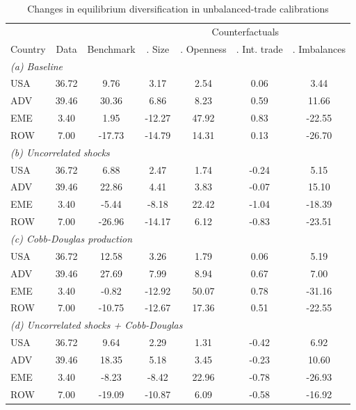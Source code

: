 \begin{table}[p]
\begin{center}
\caption{Changes in equilibrium diversification in unbalanced-trade calibrations}
\label{tab:results-div-sens}
\small
\begin{tabular}{l c c c c c c}
\toprule
& & & \multicolumn{4}{c}{Counterfactuals}\\
\cmidrule(rl){4-7}
Country & \multicolumn{1}{p{2.0cm}}{\centering Data} & \multicolumn{1}{p{2.0cm}}{\centering Benchmark} & \multicolumn{1}{p{2.0cm}}{\centering 1. Size} & \multicolumn{1}{p{2.0cm}}{\centering 2. Openness} & \multicolumn{1}{p{2.0cm}}{\centering 3. Int. trade} &\multicolumn{1}{p{2.0cm}}{\centering 4. Imbalances}\\
\midrule
\multicolumn{6}{l}{\textit{(a) Baseline}}\\
USA& 36.72&9.76&3.17&2.54&0.06&3.44\\
ADV& 39.46&30.36&6.86&8.23&0.59&11.66\\
EME& 3.40&1.95&-12.27&47.92&0.83&-22.55\\
ROW& 7.00&-17.73&-14.79&14.31&0.13&-26.70\\
\midrule
\multicolumn{6}{l}{\textit{(b) Uncorrelated shocks}}\\
USA& 36.72&6.88&2.47&1.74&-0.24&5.15\\
ADV& 39.46&22.86&4.41&3.83&-0.07&15.10\\
EME& 3.40&-5.44&-8.18&22.42&-1.04&-18.39\\
ROW& 7.00&-26.96&-14.17&6.12&-0.83&-23.51\\
\midrule
\multicolumn{6}{l}{\textit{(c) Cobb-Douglas production}}\\
USA& 36.72&12.58&3.26&1.79&0.06&5.19\\
ADV& 39.46&27.69&7.99&8.94&0.67&7.00\\
EME& 3.40&-0.82&-12.92&50.07&0.78&-31.16\\
ROW& 7.00&-10.75&-12.67&17.36&0.51&-22.55\\
\midrule
\multicolumn{6}{l}{\textit{(d) Uncorrelated shocks + Cobb-Douglas}}\\
USA& 36.72&9.64&2.29&1.31&-0.42&6.92\\
ADV& 39.46&18.35&5.18&3.45&-0.23&10.60\\
EME& 3.40&-8.23&-8.42&22.96&-0.78&-26.93\\
ROW& 7.00&-19.09&-10.87&6.09&-0.58&-16.92\\
\bottomrule
\end{tabular}
\normalsize
\end{center}
\end{table}
